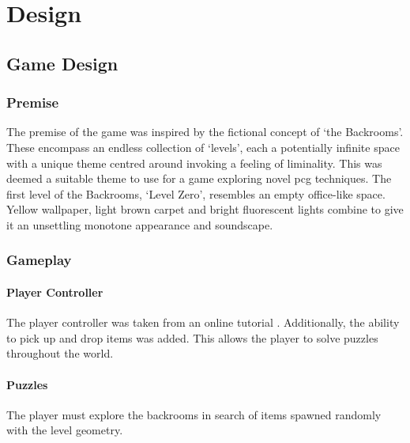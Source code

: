 \chapter{Design}
\section{Game Design}
\subsection{Premise}
The premise of the game was inspired by the fictional concept of `the Backrooms'. These encompass an endless collection of `levels', each a potentially infinite space with a unique theme centred around invoking a feeling of liminality. This was deemed a suitable theme to use for a game exploring novel \acrlong{pcg} techniques. The first level of the Backrooms, `Level Zero', resembles an empty office-like space. Yellow wallpaper, light brown carpet and bright fluorescent lights combine to give it an unsettling monotone appearance and soundscape.


\subsection{Gameplay}
\subsubsection{Player Controller}
The player controller was taken from an online tutorial \cite{FPS_controller_YouTube, FPS_controller_GitHub}. Additionally, the ability to pick up and drop items was added. This allows the player to solve puzzles throughout the world.

\subsubsection{Puzzles}
The player must explore the backrooms in search of items spawned randomly with the level geometry.

